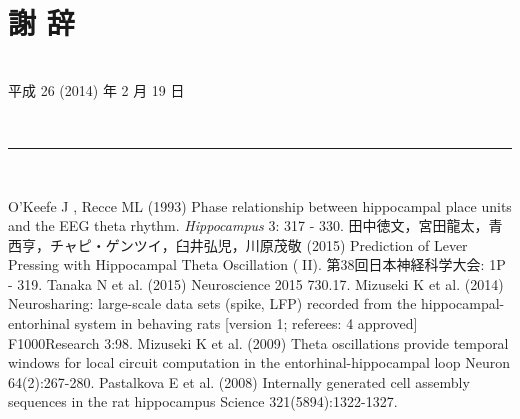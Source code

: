 \chapter*{謝 辞}
\vspace{12pt}
\hspace{19pc}\\平成 26 (2014) 年 2 月 19 日\\
\begin{center}
\vspace*{1cm}
~~~~~~~~~~~~~~~~~~~~~~~~~~~~~~~~~~~~~~~~~~~~~~~~~~~~~~~~\rule{60mm}{1pt}\\
\vspace*{2cm}
\end{center}
\newpage
\begin{thebibliography}{99}
O'Keefe J , Recce ML (1993) 
 Phase relationship between hippocampal place units and the EEG theta rhythm. 
 {\it Hippocampus} 3: 317 - 330. 
田中徳文，宮田龍太，青西亨，チャピ・ゲンツイ，臼井弘児，川原茂敬 (2015) 
Prediction of Lever Pressing with Hippocampal Theta Oscillation (II). 
第38回日本神経科学大会: 1P - 319.
Tanaka N et al. (2015) Neuroscience 2015 730.17. 
Mizuseki K et al. (2014)
Neurosharing: large-scale data sets (spike, LFP) recorded from the hippocampal-entorhinal system in behaving rats [version 1; referees: 4 approved]
 F1000Research 3:98.
Mizuseki K et al. (2009) 
Theta oscillations provide temporal windows for local circuit computation in the entorhinal-hippocampal loop
Neuron 64(2):267-280. 
Pastalkova E et al. (2008) 
Internally generated cell assembly sequences in the rat hippocampus
Science 321(5894):1322-1327.
\end{thebibliography}
\appendix

